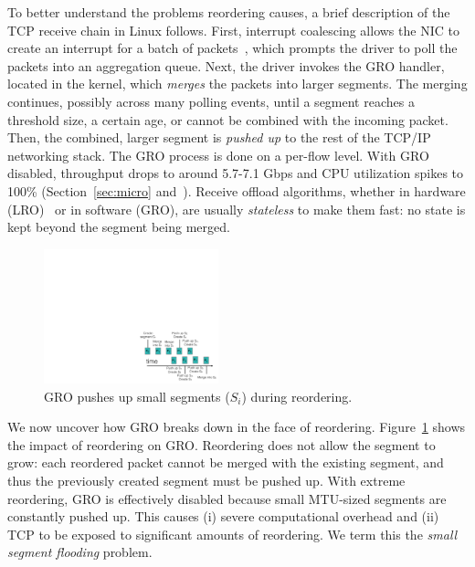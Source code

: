 To better understand the problems reordering causes, a brief description of  
the TCP receive chain in Linux follows. First, interrupt coalescing allows the NIC to create an interrupt for a batch of packets~\cite{mogul1997eliminating,understanding-linux-network},
which prompts the driver to poll the packets into an aggregation queue. Next, the driver
invokes the GRO handler, located in the kernel, which
{\em merges} the packets into larger segments. The merging continues,
possibly across many polling events, until a segment
reaches a threshold size, a certain age, or cannot be combined with the incoming packet. Then, the
combined, larger segment is {\em pushed up} to the rest of the TCP/IP networking stack. The GRO process is
done on a per-flow level. With GRO disabled, throughput drops to around
5.7-7.1 Gbps and CPU utilization spikes to 100\% (Section~\ref{sec:micro} and~\cite{bullettrains}). 
Receive offload algorithms, whether in hardware (LRO)~\cite{grossman2005large,open-lro} or in software (GRO), are usually
{\em stateless} to make them fast: no state is kept beyond the segment being merged.



\begin{figure}[t]
        \centering
  \includegraphics[width=0.45\textwidth]{presto/figures/gro-design/gro-break.pdf}
        \caption{GRO pushes up small segments ($S_i$) during reordering.}
        \label{gro-break}
\end{figure}


We now uncover how GRO breaks down in the face of reordering. Figure~\ref{gro-break} shows the impact of reordering on GRO.  Reordering does not allow the segment to grow: each reordered packet cannot be merged with the existing segment, and thus the previously created segment must be pushed up. With extreme reordering, GRO is effectively disabled because small MTU-sized segments are constantly pushed up. This causes (i) severe computational overhead and (ii) TCP to be exposed to significant amounts of reordering. We term this the {\em small segment flooding} problem.

